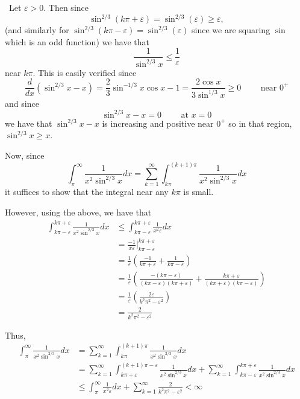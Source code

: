 \documentclass[12pt]{Homework}
\begin{document}
\begin{solution}$\,$
Let $\varepsilon>0$. Then since $$\sin^{2/3}(k\pi+\varepsilon)=\sin^{2/3}(\varepsilon)\ge\varepsilon,$$ (and similarly for $\sin^{2/3}(k\pi-\varepsilon)=\sin^{2/3}(\varepsilon)$ since we are squaring $\sin$ which is an odd function) we have that $$\frac{1}{\sin^{2/3}x}\le\frac{1}{\varepsilon}$$ near $k\pi$. This is easily verified since $$\frac{d}{dx}(\sin^{2/3}x-x)=\frac{2}{3}\sin^{-1/3}x\cos x-1=\frac{2\cos x}{3\sin^{1/3}x}\ge0\qquad\text{ near }0^+$$ and since $$\sin^{2/3}x-x=0\qquad\text{ at }x=0$$ we have that $\sin^{2/3}x-x$ is increasing and positive near $0^+$ so in that region, $\sin^{2/3}x\ge x$.

Now, since $$\int_\pi^\infty\frac{1}{x^2\sin^{2/3}x}dx=\sum_{k=1}^\infty\int_{k\pi}^{(k+1)\pi}\frac{1}{x^2\sin^{2/3}x}dx$$ it suffices to show that the integral near any $k\pi$ is small.

However, using the above, we have that 
\begin{align*}
    \int_{k\pi-\varepsilon}^{k\pi+\varepsilon}\frac{1}{x^2\sin^{2/3}x}dx&\le\int_{k\pi-\varepsilon}^{k\pi+\varepsilon}\frac{1}{x^2\varepsilon}dx\\
    &=\frac{-1}{x\varepsilon}\bigg|_{k\pi-\varepsilon}^{k\pi+\varepsilon}\\
    &=\frac{1}{\varepsilon}\left(\frac{-1}{k\pi+\varepsilon}+\frac{1}{k\pi-\varepsilon}\right)\\
    &=\frac{1}{\varepsilon}\left(\frac{-(k\pi-\varepsilon)}{(k\pi-\varepsilon)(k\pi+\varepsilon)}+\frac{k\pi+\varepsilon}{(k\pi+\varepsilon)(k\pi-\varepsilon)}\right)\\
    &=\frac{1}{\varepsilon}\left(\frac{2\varepsilon}{k^2\pi^2-\varepsilon^2}\right)\\
    &=\frac{2}{k^2\pi^2-\varepsilon^2}
\end{align*} 

Thus, \begin{align*}
    \int_\pi^\infty\frac{1}{x^2\sin^{2/3}x}dx&=\sum_{k=1}^\infty\int_{k\pi}^{(k+1)\pi}\frac{1}{x^2\sin^{2/3}x}dx\\
    &=\sum_{k=1}^\infty\int_{k\pi+\varepsilon}^{(k+1)\pi-\varepsilon}\frac{1}{x^2\sin^{2/3}x}dx+\sum_{k=1}^\infty\int_{k\pi-\varepsilon}^{k\pi+\varepsilon}\frac{1}{x^2\sin^{2/3}x}dx\\
    &\le\int_\pi^\infty\frac{1}{x^2\varepsilon}dx+\sum_{k=1}^\infty\frac{2}{k^2\pi^2-\varepsilon^2}<\infty
\end{align*}

\end{solution}
\newpage
\end{document}
